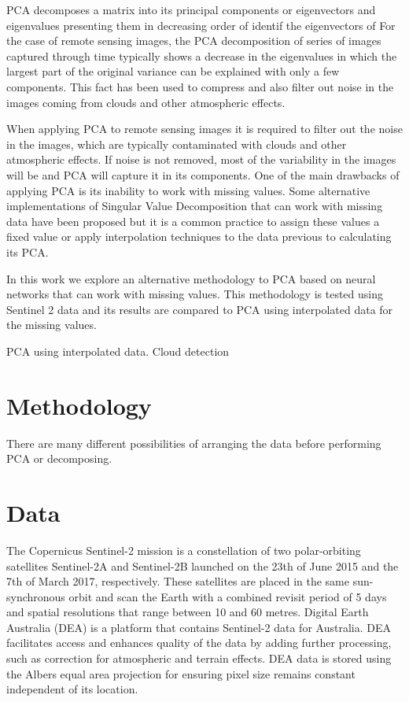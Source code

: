 \documentclass[essd, manuscript]{copernicus}
\begin{document}
PCA decomposes a matrix into its principal components or eigenvectors and eigenvalues presenting them in decreasing order of identif the eigenvectors of 
For the case of remote sensing images, the PCA decomposition of series of images captured through time typically shows a decrease in the eigenvalues in which the largest part of the original variance can be explained with only a few components. This fact has been used to compress and also filter out noise in the images coming from clouds and other atmospheric effects.

When applying PCA to remote sensing images it is required to filter out the noise in the images, which are typically contaminated with clouds and other atmospheric effects. If noise is not removed, most of the variability in the images will be and PCA will capture it in its components. One of the main drawbacks of applying PCA is its inability to work with missing values. Some alternative implementations of Singular Value Decomposition that can work with missing data have been proposed but it is a common practice to assign these values a fixed value or apply interpolation techniques to the data previous to calculating its PCA.

In this work we explore an alternative methodology to PCA based on neural networks that can work with missing values. This methodology is tested using Sentinel 2 data and its results are compared to PCA using interpolated data for the missing values. 

PCA using interpolated data. Cloud detection 


\section{Methodology}


There are many different possibilities of arranging the data before performing PCA or decomposing. 


\section{Data}

The Copernicus Sentinel-2 mission \citep{drusch2012sentinel} is a constellation of two polar-orbiting satellites Sentinel-2A and Sentinel-2B launched on the 23th of June 2015 and the 7th of March 2017, respectively. These satellites are placed in the same sun-synchronous orbit and scan the Earth with a combined revisit period of 5 days and spatial resolutions that range between 10 and 60 metres. Digital Earth Australia (DEA) \citep{dhu2017digital} is a platform that contains Sentinel-2 data for Australia. DEA facilitates access and enhances quality of the data by adding further processing, such as correction for atmospheric and terrain effects. DEA data is stored using the Albers equal area projection for ensuring pixel size remains constant independent of its location.
\end{document}
